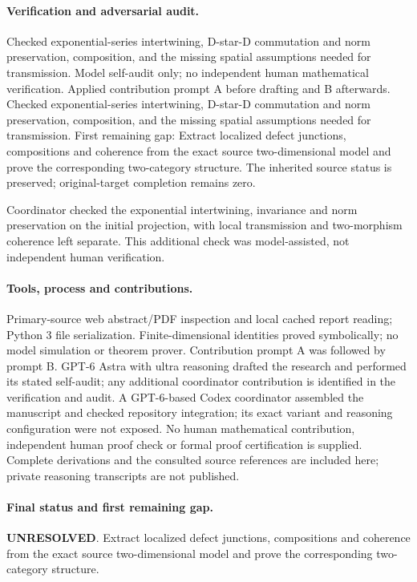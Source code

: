 \documentclass[11pt]{article}
\begin{document}
\paragraph{Verification and adversarial audit.}
Checked exponential-series intertwining, D-star-D commutation and norm preservation, composition, and the missing spatial assumptions needed for transmission. Model self-audit only; no independent human mathematical verification. Applied contribution prompt A before drafting and B afterwards. Checked exponential-series intertwining, D-star-D commutation and norm preservation, composition, and the missing spatial assumptions needed for transmission. First remaining gap: Extract localized defect junctions, compositions and coherence from the exact source two-dimensional model and prove the corresponding two-category structure. The inherited source status is preserved; original-target completion remains zero.

Coordinator checked the exponential intertwining, invariance and norm preservation on the initial projection, with local transmission and two-morphism coherence left separate. This additional check was model-assisted, not independent human verification.

\paragraph{Tools, process and contributions.}
Primary-source web abstract/PDF inspection and local cached report reading; Python 3 file serialization. Finite-dimensional identities proved symbolically; no model simulation or theorem prover. Contribution prompt A was followed by prompt B. GPT-6 Astra with ultra reasoning drafted the research and performed its stated self-audit; any additional coordinator contribution is identified in the verification and audit. A GPT-6-based Codex coordinator assembled the manuscript and checked repository integration; its exact variant and reasoning configuration were not exposed. No human mathematical contribution, independent human proof check or formal proof certification is supplied. Complete derivations and the consulted source references are included here; private reasoning transcripts are not published.

\paragraph{Final status and first remaining gap.}
\textbf{UNRESOLVED}. Extract localized defect junctions, compositions and coherence from the exact source two-dimensional model and prove the corresponding two-category structure.
\end{document}
